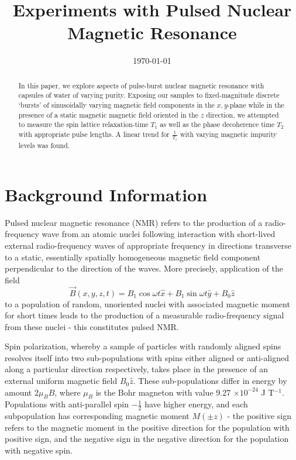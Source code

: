 \documentclass[aps,prl,nofootinbib,twocolumn,superscriptaddress,groupedaddress]{revtex4}  %
\begin{document}
\title{Experiments with Pulsed Nuclear Magnetic Resonance}
\date{\today}

\begin{abstract}
In this paper, we explore aspects of pulse-burst nuclear magnetic resonance with capsules of water of varying purity. Exposing our samples to fixed-magnitude discrete `bursts' of sinusoidally varying magnetic field components in the $x,y$-plane while in the presence of a static magnetic magnetic field oriented in the $z$ direction, we attempted to measure the spin lattice relaxation-time $T_{1}$ as well as the phase decoherence time $T_{2}$ with appropriate pulse lengths. A linear trend for $\frac{1}{T_{1}}$ with varying magnetic impurity levels was found.
\end{abstract}

\maketitle

\section{Background Information}
Pulsed nuclear magnetic resonance (NMR) refers to the production of a radio-frequency wave from an atomic nuclei following interaction with short-lived external radio-frequency waves of appropriate frequency in directions transverse to a static, essentially spatially homogeneous magnetic field component perpendicular to the direction of the waves. More precisely, application of the field \begin{equation}
\vec{B}(x,y,z,t) = B_{1}\cos \omega t \hat{x} + B_{1}\sin \omega t \hat{y} + B_{0}\hat{z}
\end{equation}
to a population of random, unoriented nuclei with associated magnetic moment for short times leads to the production of a measurable radio-frequency signal from these nuclei - this constitutes pulsed NMR\cite{lab}.

Spin polarization, whereby a sample of particles with randomly aligned spins resolves itself into two sub-populations with spins either aligned or anti-aligned along a particular direction respectively, takes place in the presence of an external uniform magnetic field $B_{0}\hat{z}$. These sub-populations differ in energy by amount $2\mu_{B}B$, where $\mu_{B}$ is the Bohr magneton with value 9.27 $\times 10^{-24}$ J T$^{-1}$. Populations with anti-parallel spin $-\frac{1}{2}$ have higher energy, and each subpopulation has corresponding magnetic moment $M(\pm z)$ - the positive sign refers to the magnetic moment in the positive direction for the population with positive sign, and the negative sign in the negative direction for the population with negative spin.
\end{document}
